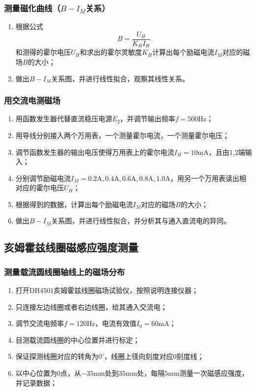\documentclass[zihao=5, UTF8]{article}
\theoremstyle{MyLineTheoremStyle} %
\theoremstyle{MyBlockTheoremStyle} %
\theoremstyle{MySubsubsectionStyle} %
\begin{document}
\subsubsection{测量磁化曲线（$B-I_M$关系）}
\begin{enumerate}
    \item 根据公式
    \[
    B=\frac{U_H}{K_H I_H}
    \]
    和测得的霍尔电压$U_H$和求出的霍尔灵敏度$K_H$计算出每个励磁电流$I_M$对应的磁场$B$的大小；
    \item 做出$B-I_M$关系图，并进行线性拟合，观察其线性关系。
\end{enumerate}

\subsubsection{用交流电测磁场}
\begin{enumerate}
    \item 用函数发生器代替直流稳压电源$E_2$，并调节输出频率$f=500\text{Hz}$；
    \item 用导线分别接入两个万用表，一个测量霍尔电流，一个测量霍尔电压；
    \item 调节函数发生器的输出电压使得万用表上的霍尔电流$I_H=10\text{mA}$，且由1,2端输入；
    \item 分别调节励磁电流$I_M=0.2\text{A},0.4\text{A},0.6\text{A},0.8\text{A},1.0\text{A}$，用另一个万用表读出相对应的霍尔电压$U_H$；
    \item 根据得到的数据，计算出每个励磁电流$I_M$对应的磁场$B$的大小；
    \item 做出$B-I_M$关系图，并进行线性拟合，并分析其与通入直流电的异同。
\end{enumerate}

\subsection{亥姆霍兹线圈磁感应强度测量}

\subsubsection{测量载流圆线圈轴线上的磁场分布}
\begin{enumerate}
    \item 打开DH4501亥姆霍兹线圈磁场试验仪，按照说明连接仪器；
    \item 只连接左边线圈或者右边线圈，给其通入交流电；
    \item 调节交流电频率$f=120\text{Hz}$，电流有效值$I_0=60\text{mA}$；
    \item 目测载流圆线圈的中心位置并进行标定；
    \item 保证探测线圈对应的转角为$0^\circ$，线圈上径向刻度对应0刻度线；
    \item 以中心位置为0点，从$-35\text{mm}$处到$35\text{mm}$处，每隔$5\text{mm}$测量一次磁感应强度，并记录数据；
\end{enumerate}
\end{document}
